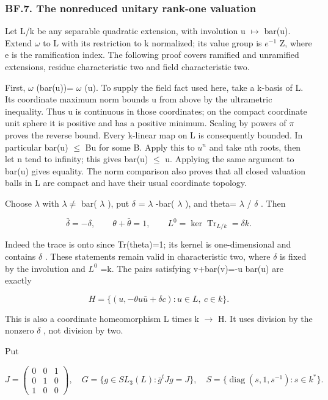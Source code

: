 \documentclass[
  11pt,
]{article}
\begin{document}
\subsubsection{BF.7. The nonreduced unitary rank-one
valuation}\label{bf.7.-the-nonreduced-unitary-rank-one-valuation}

Let L/k be any separable quadratic extension, with involution u
\(\mapsto\) bar(u). Extend \(\omega\) to L with its restriction to k
normalized; its value group is \(e^{-1}\) Z, where e is the ramification
index. The following proof covers ramified and unramified extensions,
residue characteristic two and field characteristic two.

First, \(\omega\) (bar(u))= \(\omega\) (u). To supply the field fact
used here, take a k-basis of L. Its coordinate maximum norm bounds
\textbar u\textbar{} from above by the ultrametric inequality. Thus
\textbar u\textbar{} is continuous in those coordinates; on the compact
coordinate unit sphere it is positive and has a positive minimum.
Scaling by powers of \(\pi\) proves the reverse bound. Every k-linear
map on L is consequently bounded. In particular
\textbar bar(u)\textbar{} \(\le\) B\textbar u\textbar{} for some B.
Apply this to \(u^n\) and take nth roots, then let n tend to infinity;
this gives \textbar bar(u)\textbar{} \(\le\) \textbar u\textbar.
Applying the same argument to bar(u) gives equality. The norm comparison
also proves that all closed valuation balls in L are compact and have
their usual coordinate topology.

Choose \(\lambda\) with \(\lambda \ne\) bar( \(\lambda\) ), put
\(\delta\) = \(\lambda\) -bar( \(\lambda\) ), and theta= \(\lambda\) /
\(\delta\) . Then

\[
 \bar\delta=-\delta,\qquad \theta+\bar\theta=1,
 \qquad L^0=\ker\operatorname{Tr}_{L/k}=\delta k.
 \tag{BF.12}
\]

Indeed the trace is onto since Tr(theta)=1; its kernel is
one-dimensional and contains \(\delta\) . These statements remain valid
in characteristic two, where \(\delta\) is fixed by the involution and
\(L^0\) =k. The pairs satisfying v+bar(v)=-u bar(u) are exactly

\[
 H=\{(u,-\theta u\bar u+\delta c):u\in L,\ c\in k\}.
 \tag{BF.13}
\]

This is also a coordinate homeomorphism L times k \(\to\) H. It uses
division by the nonzero \(\delta\) , not division by two.

Put

\[
 J=\begin{pmatrix}0&0&1\\0&1&0\\1&0&0\end{pmatrix},
 \quad G=\{g\in SL_3(L):\bar g^tJg=J\},
 \quad S=\{\operatorname{diag}(s,1,s^{-1}):s\in k^*\}.
\]
\end{document}
